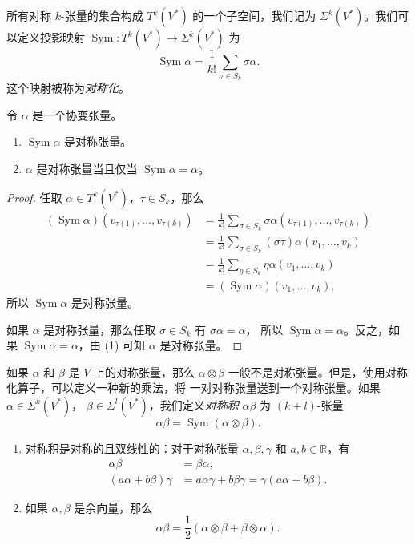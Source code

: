 \documentclass[fontset=none]{Notes}
\DeclareMathOperator\Sym{Sym}
\begin{document}
所有对称 $k$-张量的集合构成 $T^k(V^*)$ 的一个子空间，我们记为
$\Sigma^k(V^*)$。我们可以定义投影映射 $\Sym:T^k(V^*)\to \Sigma^k(V^*)$
为
\[
  \Sym \alpha=\frac{1}{k!}\sum_{\sigma\in S_k}\sigma\alpha.  
\]
这个映射被称为\emph{对称化}。

\begin{proposition}[对称化的性质]
  令 $\alpha$ 是一个协变张量。
  \begin{enumerate}
    \item $\Sym\alpha$ 是对称张量。
    \item $\alpha$ 是对称张量当且仅当 $\Sym\alpha=\alpha$。
  \end{enumerate}
\end{proposition}
\begin{proof}
  任取 $\alpha\in T^k(V^*)$，$\tau\in S_k$，那么
  \begin{align*}
    (\Sym\alpha)(v_{\tau(1)},\dots,v_{\tau(k)})&=
    \frac{1}{k!}\sum_{\sigma\in S_k}\sigma\alpha(v_{\tau(1)},\dots,v_{\tau(k)})\\
    &=\frac{1}{k!}\sum_{\sigma\in S_k}(\sigma\tau)\alpha(v_1,\dots,v_k)\\
    &=\frac{1}{k!}\sum_{\eta\in S_k}\eta\alpha(v_1,\dots,v_k)\\
    &=(\Sym\alpha)(v_1,\dots,v_k),
  \end{align*}
  所以 $\Sym\alpha$ 是对称张量。

  如果 $\alpha$ 是对称张量，那么任取 $\sigma\in S_k$ 有 $\sigma\alpha=\alpha$，
  所以 $\Sym\alpha=\alpha$。反之，如果 $\Sym\alpha=\alpha$，由 (1)
  可知 $\alpha$ 是对称张量。
\end{proof}

如果 $\alpha$ 和 $\beta$ 是 $V$ 上的对称张量，那么 $\alpha\otimes\beta$
一般不是对称张量。但是，使用对称化算子，可以定义一种新的乘法，将
一对对称张量送到一个对称张量。如果 $\alpha\in \Sigma^k(V^*)$，
$\beta\in \Sigma^l(V^*)$，我们定义\emph{对称积} $\alpha\beta$
为 $(k+l)$-张量
\[
  \alpha\beta=\Sym(\alpha\otimes\beta).  
\]

\begin{proposition}[对称积的性质]
  \mbox{}
  \begin{enumerate}
    \item 对称积是对称的且双线性的：对于对称张量 $\alpha,\beta,\gamma$
    和 $a,b\in \mathbb{R}$，有
    \begin{align*}
      \alpha\beta&=\beta\alpha,\\
      (a\alpha+b\beta)\gamma&=a\alpha\gamma+b\beta\gamma=
      \gamma(a\alpha+b\beta).
    \end{align*}
    \item 如果 $\alpha,\beta$ 是余向量，那么
    \[
      \alpha\beta=\frac{1}{2}(\alpha\otimes\beta+\beta\otimes\alpha).  
    \]
  \end{enumerate}
\end{proposition}
\end{document}
